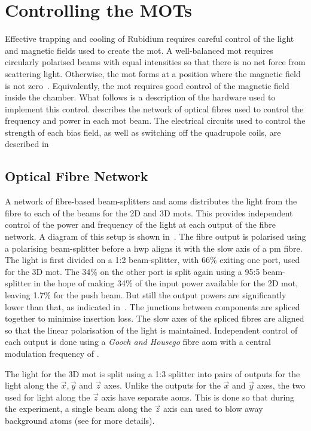 \section{Controlling the MOTs}\label{sec:mot_control} Effective
trapping and cooling of Rubidium requires careful control of the light
and magnetic fields used to create the \ac{mot}. A well-balanced
\ac{mot} requires circularly polarised beams with equal intensities so
that there is no net force from scattering light. Otherwise, the
\ac{mot} forms at a position where the magnetic field is not
zero~\cite{Steane1992}. Equivalently, the \ac{mot} requires good
control of the magnetic field inside the chamber. What follows is a
description of the hardware used to implement this control.
 describes the network of optical
fibres used to control the frequency and power in each \ac{mot} beam.
The electrical circuits used to control the strength of each bias
field, as well as switching off the quadrupole coils, are described
in~ 
\subsection{Optical Fibre
Network}\label{subsec:optical_fibre} A network of fibre-based
beam-splitters and \acp{aom} distributes the light from the \Muquans
fibre to each of the beams for the 2D and 3D \acp{mot}. This provides
independent control of the power and frequency of the light at each
output of the fibre network. A diagram of this setup is shown
in~. The \Muquans fibre output is
polarised using a polarising beam-splitter before a \ac{hwp} aligns it
with the slow axis of a \ac{pm} fibre. The light is first divided on a
1:2 beam-splitter, with 66\% exiting one port, used for the 3D
\ac{mot}. The 34\% on the other port is split again using a 95:5
beam-splitter in the hope of making 34\% of the input power available
for the 2D \ac{mot}, leaving 1.7\% for the push beam.
But still the output powers are significantly lower than that, as
indicated in~. The
junctions between components are spliced together to minimise
insertion loss. The slow axes of the spliced fibres are aligned so that the
linear polarisation of the light is maintained. Independent control of each
output is done using a \textit{Gooch and Housego} fibre \ac{aom} with
a central modulation frequency of . \par\noindent The light
for the 3D \ac{mot} is split using a 1:3 splitter into pairs of
outputs for the light along the \(\vec{x},\vec{y}\) and \(\vec{z}\)
axes. Unlike the outputs for the $\vec{x}$ and $\vec{y}$ axes, the two used for light
along the \(\vec{z}\) axis have separate \acp{aom}. This is done so
that during the experiment, a single beam along the \(\vec{z}\) axis
can used to blow away background atoms (see
 for more details).

